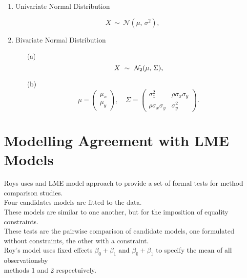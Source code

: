 \documentclass[12pt, a4paper]{report}
\theoremstyle{plain}
\theoremstyle{definition}
\theoremstyle{remark}
\begin{document}
\bigskip

\begin{enumerate}
	\item Univariate Normal Distribution
	
	\[
	X\ \sim\ \mathcal{N}(\mu,\, \sigma^2),
	\]
	
	\item Bivariate Normal Distribution
	
	\begin{itemize}
		\item[(a)] \[  X\ \sim\ \mathcal{N}_2(\mu,\, \Sigma), \vspace{1cm}\]
		\item[(b)] \[    \mu = \begin{pmatrix} \mu_x \\ \mu_y \end{pmatrix}, \quad
		\Sigma = \begin{pmatrix} \sigma_x^2 & \rho \sigma_x \sigma_y \\
		\rho \sigma_x \sigma_y  & \sigma_y^2 \end{pmatrix}.\]
	\end{itemize}
\end{enumerate}



\section{Modelling Agreement with LME Models}



Roys uses and LME model approach to provide a set of formal tests for method comparison studies.\\

Four candidates models are fitted to the data.\\

These models are similar to one another, but for the imposition of equality constraints.\\

These tests are the pairwise comparison of candidate models, one formulated without constraints, the other with a constraint.\\


Roy's model uses fixed effects $\beta_0 + \beta_1$ and $\beta_0 + \beta_1$ to specify the mean of all observationsby \\ methods 1 and 2 respectuively.
\end{document}
